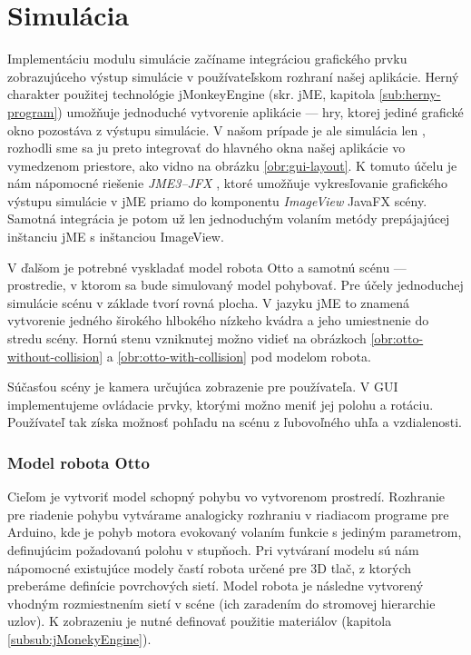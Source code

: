 \section{Simulácia}
Implementáciu modulu simulácie začíname integráciou grafického prvku zobrazujúceho výstup simulácie v používateľskom rozhraní našej aplikácie. Herný charakter použitej technológie jMonkeyEngine (skr. jME, kapitola \ref{sub:herny-program}) umožňuje jednoduché vytvorenie aplikácie --- hry, ktorej jediné grafické okno pozostáva z výstupu simulácie. V našom prípade je ale simulácia len , rozhodli sme sa ju preto integrovať do hlavného okna našej aplikácie vo vymedzenom priestore, ako vidno na obrázku \ref{obr:gui-layout}. K tomuto účelu je nám nápomocné riešenie \textit{JME3--JFX} \cite{jmejfx}, ktoré umožňuje vykresľovanie grafického výstupu simulácie v jME priamo do komponentu \textit{ImageView} JavaFX scény. Samotná integrácia je potom už len jednoduchým volaním metódy prepájajúcej inštanciu jME s inštanciou ImageView.

V ďalšom je potrebné vyskladať model robota Otto a samotnú scénu --- prostredie, v ktorom sa bude simulovaný model pohybovať. Pre účely jednoduchej simulácie scénu v základe tvorí rovná plocha. V jazyku jME to znamená vytvorenie jedného širokého hlbokého nízkeho kvádra a jeho umiestnenie do stredu scény. Hornú stenu vzniknutej  možno vidieť na obrázkoch \ref{obr:otto-without-collision} a \ref{obr:otto-with-collision} pod modelom robota.

Súčasťou scény je kamera určujúca zobrazenie pre používateľa. V GUI implementujeme ovládacie prvky, ktorými možno meniť jej polohu a rotáciu. Používateľ tak získa možnosť pohľadu na scénu z ľubovoľného uhľa a vzdialenosti. 

\subsubsection{Model robota Otto}
Cieľom je vytvoriť model schopný pohybu vo vytvorenom prostredí. Rozhranie pre riadenie pohybu vytvárame analogicky rozhraniu v riadiacom programe pre Arduino, kde je pohyb motora evokovaný volaním funkcie s jediným parametrom, definujúcim požadovanú polohu v stupňoch. Pri vytváraní modelu sú nám nápomocné existujúce modely častí robota určené pre 3D tlač, z ktorých preberáme definície povrchových sietí. Model robota je následne vytvorený vhodným rozmiestnením sietí v scéne (ich zaradením do stromovej hierarchie uzlov). K zobrazeniu je nutné definovať použitie materiálov (kapitola \ref{subsub:jMonekyEngine}).

